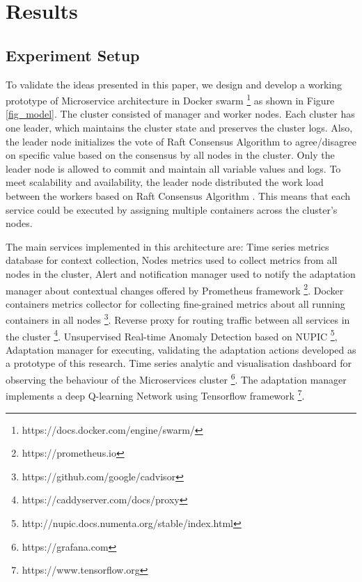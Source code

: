 \documentclass{ieeeaccess}
\begin{document}
 \section{Results}
\subsection{Experiment Setup} 
\label{sec:evaluation}
 
To validate the ideas presented in this paper, we design and develop a working prototype of Microservice architecture in Docker swarm \footnote{https://docs.docker.com/engine/swarm/} as shown in Figure \ref{fig_model}. The cluster consisted of manager and worker nodes. Each cluster has one leader, which maintains the cluster state and preserves the cluster logs. Also, the leader node initializes the vote of Raft Consensus Algorithm \cite{ongaro2015raft} to agree/disagree on specific value based on the consensus by all nodes in the cluster. Only the leader node is allowed to commit and maintain all variable values and logs. To meet scalability and availability, the leader node distributed the work load between the workers based on Raft Consensus Algorithm \cite{ongaro2015raft}. This means that each service could be executed by assigning multiple containers across the cluster's nodes. 

The main services implemented in this architecture are: Time series metrics database for context collection, Nodes metrics used to collect metrics from all nodes in the cluster, Alert and notification manager used to notify the adaptation manager about contextual changes offered by  Prometheus framework \footnote{https://prometheus.io}. Docker containers metrics collector for collecting fine-grained metrics about all running containers in all nodes \footnote{https://github.com/google/cadvisor}. Reverse proxy for routing traffic between all services in the cluster \footnote{https://caddyserver.com/docs/proxy}. Unsupervised Real-time Anomaly Detection based on NUPIC \footnote{http://nupic.docs.numenta.org/stable/index.html}, Adaptation manager for executing, validating the adaptation actions developed as a prototype of this research. Time series analytic and visualisation dashboard for observing the behaviour of the Microservices cluster \footnote{https://grafana.com}. The adaptation manager implements a deep Q-learning Network using Tensorflow framework \footnote{https://www.tensorflow.org}. 
\end{document}
